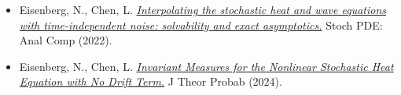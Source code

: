 \documentclass[11pt]{article}
\begin{document}
\begin{itemize}[leftmargin=*,nosep]

    \item[1:]
    Eisenberg, N., Chen, L.
    \href{https://doi.org/10.1007/s40072-022-00258-6}
    {\textit{Interpolating the stochastic heat and wave equations with
    time-independent noise: solvability and exact asymptotics.}}
    Stoch PDE: Anal Comp (2022).

    \item[2:]
    Eisenberg, N., Chen, L.
    \href{https://doi.org/10.1007/s10959-023-01302-4}
    {\textit{Invariant Measures for the Nonlinear Stochastic Heat Equation
    with No Drift Term.}}
    J Theor Probab (2024).

\end{itemize}
\end{document}
